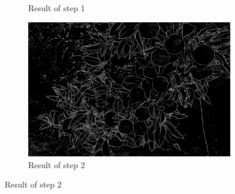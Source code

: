 \documentclass[conference]{IEEEtran}
\begin{document}
\begin{figure}
\begin{subfigure}{.33\linewidth}
   	\caption{Result of step 1}
  \end{subfigure}
  \begin{subfigure}{.33\linewidth}
  	\includegraphics[width=\linewidth]{citrus1/citrus1_mean.jpg}
  	\caption{Result of step 2}
  \end{subfigure}\par\medskip
  

\end{figure}
\end{document}
